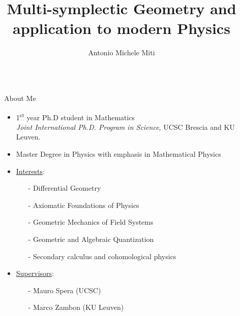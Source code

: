 \documentclass[final,20pt]{beamer}
\title{Multi-symplectic Geometry and application to modern Physics} %
\author{Antonio Michele Miti} %
\institute{	Department of Mathematics and Physics, 
				Universit\`{a} Cattolica del Sacro Cuore, Brescia, Italy
				}%
\newlength{\sepwidexternal}
\newlength{\onecolwid}
\begin{document}

\setlength{\belowcaptionskip}{2ex} %
\setlength\belowdisplayshortskip{2ex} %

\begin{frame}[t] %
\begin{columns}[t] %


	\begin{column}{\sepwidexternal}\end{column} %
	\begin{column}{\onecolwid} %

		\begin{alertblock}{About Me}
			\begin{itemize}
				\item 
					1\textsuperscript{st}	year Ph.D student in Mathematics \\ 
					\emph{Joint International Ph.D. Program in Science}, 
					UCSC Brescia and KU Leuven.
				
				\item Master Degree in Physics with emphasis in Mathematical Physics
				\item \underline{Interests}:
					\begin{itemize}
						\item[-] Differential Geometry
						\item[-] Axiomatic Foundations of Physics
						\item[-] Geometric Mechanics of Field Systems
						\item[-] Geometric and Algebraic Quantization
						\item[-] Secondary calculus and cohomological physics
					\end{itemize}
				\item \underline{Supervisors}: 
					\begin{itemize}
						\item[-] Mauro Spera (UCSC)
						\item[-] Marco Zambon (KU Leuven)
					\end{itemize}
			\end{itemize}
		\end{alertblock}
		

\end{column}
\end{columns}
\end{frame}
\end{document}
